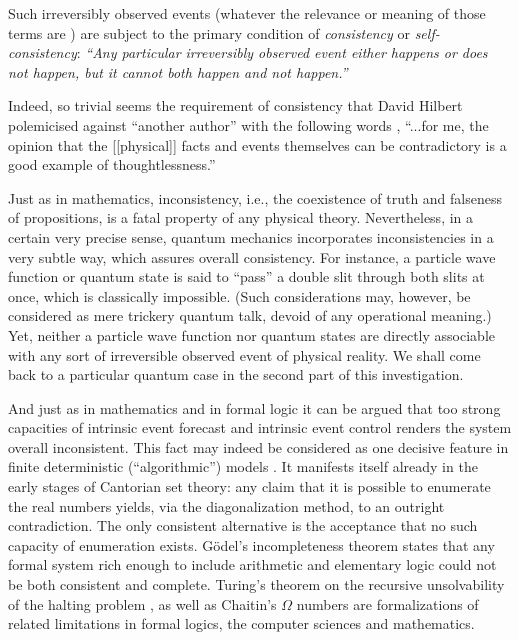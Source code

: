 Such irreversibly observed  events
(whatever the relevance or meaning of those terms are
\cite{wigner:mb,wheeler,greenberger2,hkwz})
are subject to the primary condition of {\em consistency} or
{\em self-consistency}:
{\em ``Any particular irreversibly observed event  either
happens or does not happen, but it cannot both happen and not happen.''}


Indeed, so trivial seems the requirement of consistency  that
David Hilbert polemicised against ``another
author'' with the following words \cite{hilbert-26}, ``...for me, the
opinion that the [[physical]] facts and events
themselves can be contradictory is a good example of thoughtlessness.''


Just as in mathematics, inconsistency, i.e., the coexistence of  truth
and falseness of  propositions, is a fatal property of any
physical theory. Nevertheless, in a certain very precise sense, quantum
mechanics incorporates inconsistencies in a very subtle way, which
assures overall consistency. For instance, a particle
wave function or quantum state is said to ``pass'' a double slit through both
slits at once, which is classically impossible. (Such considerations may, however, be
considered as mere trickery quantum talk, devoid of any operational meaning.)
Yet, neither a particle wave
function nor quantum states are directly associable with any sort of
irreversible observed event of physical reality.
We shall come back to a particular quantum case in the second part of this investigation.


And just as in mathematics and in formal logic it can be argued
that too strong capacities of intrinsic event forecast and intrinsic event control
renders the system overall inconsistent.
This fact may indeed be considered as one decisive feature in
finite deterministic (``algorithmic'') models \cite{svozil-93}.
It manifests itself already in the early stages of Cantorian set theory:
any claim that it is possible to enumerate the real numbers
yields, via the diagonalization method, to an outright contradiction.
The only consistent alternative is the acceptance
that no such capacity of enumeration exists.
G\"odel's incompleteness theorem   \cite{godel1} states that
any formal system rich enough to include arithmetic and elementary logic
could not be both consistent and complete.
Turing's theorem on the recursive unsolvability of the halting
problem  \cite{turing-36}, as well as Chaitin's $\Omega$ numbers
\cite{chaitin:92}
are formalizations of related limitations in formal logics, the computer sciences
and mathematics.


